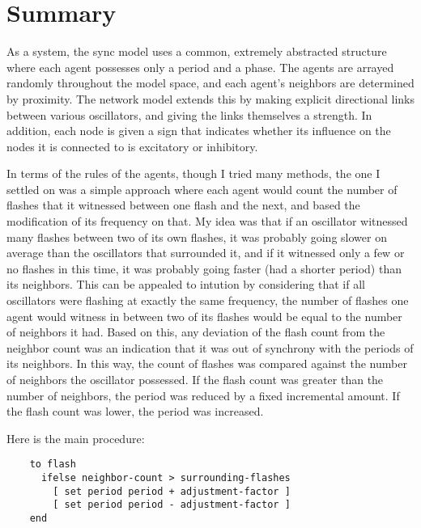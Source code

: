 \documentclass[12pt]{article}
\begin{document}
\section{Summary}

As a system, the sync model uses a common, extremely abstracted structure where each agent possesses only a period and a phase.  The agents are arrayed randomly throughout the model space, and each agent's neighbors are determined by proximity.  The network model extends this by making explicit directional links between various oscillators, and giving the links themselves a strength.  In addition, each node is given a sign that indicates whether its influence on the nodes it is connected to is excitatory or inhibitory.  

In terms of the rules of the agents, though I tried many methods, the one I settled on was a simple approach where each agent would count the number of flashes that it witnessed between one flash and the next, and based the modification of its frequency on that.  My idea was that if an oscillator witnessed many flashes between two of its own flashes, it was probably going slower on average than the oscillators that surrounded it, and if it witnessed only a few or no flashes in this time, it was probably going faster (had a shorter period) than its neighbors.  This can be appealed to intution by considering that if all oscillators were flashing at exactly the same frequency, the number of flashes one agent would witness in between two of its flashes would be equal to the number of neighbors it had.  Based on this, any deviation of the flash count from the neighbor count was an indication that it was out of synchrony with the periods of its neighbors.  In this way, the count of flashes was compared against the number of neighbors the oscillator possessed.  If the flash count was greater than the number of neighbors, the period was reduced by a fixed incremental amount.  If the flash count was lower, the period was increased.  

Here is the main procedure:

\begin{verbatim}
    to flash
      ifelse neighbor-count > surrounding-flashes 
        [ set period period + adjustment-factor ] 
        [ set period period - adjustment-factor ]
    end
\end{verbatim}
\end{document}
